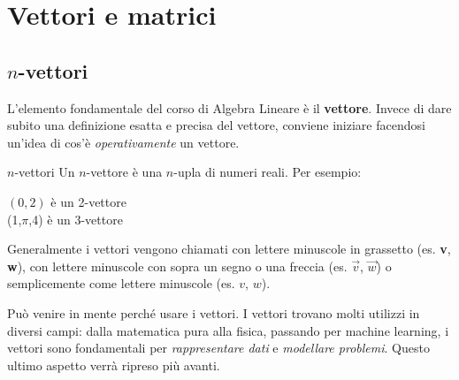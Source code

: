 \chapter{Vettori e matrici}
\section{$n$-vettori}
L'elemento fondamentale del corso di Algebra Lineare è il \textbf{vettore}. Invece di dare subito una definizione esatta e precisa del vettore, conviene iniziare facendosi un'idea di cos'è \textit{operativamente} un vettore.
\begin{newdef}{$n$-vettori}
    Un $n$-vettore è una $n$-upla di numeri reali. Per esempio:
    \begin{center}
        $(0,2)$ è un 2-vettore \\
        (1,$\pi$,4) è un 3-vettore
    \end{center}
\end{newdef}
Generalmente i vettori vengono chiamati con lettere minuscole in grassetto (es. \textbf{v}, \textbf{w}), con lettere minuscole con sopra un segno o una freccia (es. $\vec v$, $\vec w$) o semplicemente come lettere minuscole (es. $v$, $w$).

Può venire in mente perché usare i vettori. I vettori trovano molti utilizzi in diversi campi: dalla matematica pura alla fisica, passando per machine learning, i vettori sono fondamentali per \textit{rappresentare dati} e \textit{modellare problemi}. Questo ultimo aspetto verrà ripreso più avanti.

